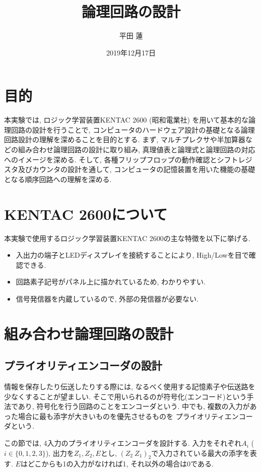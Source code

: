 \documentclass[titlepage]{jsarticle}
\title{論理回路の設計}
\author{平田 蓮}
\date{2019年12月17日}
\begin{document}
\maketitle
\section{目的}
  本実験では, ロジック学習装置KENTAC 2600 (昭和電業社) を用いて基本的な論理回路の設計を行うことで,
  コンピュータのハードウェア設計の基礎となる論理回路設計の理解を深めることを目的とする.
  まず, マルチプレクサや半加算器などの組み合わせ論理回路の設計に取り組み,
  真理値表と論理式と論理回路の対応へのイメージを深める.
  そして, 各種フリップフロップの動作確認とシフトレジスタ及びカウンタの設計を通して,
  コンピュータの記憶装置を用いた機能の基礎となる順序回路への理解を深める.
\section{KENTAC 2600について}
  本実験で使用するロジック学習装置KENTAC 2600の主な特徴を以下に挙げる.
  \begin{itemize}
    \item 入出力の端子とLEDディスプレイを接続することにより, High/Lowを目で確認できる.
    \item 回路素子記号がパネル上に描かれているため, わかりやすい.
    \item 信号発信器を内蔵しているので, 外部の発信器が必要ない.
  \end{itemize}
\section{組み合わせ論理回路の設計}
  \subsection{プライオリティエンコーダの設計}
    情報を保存したり伝送したりする際には, なるべく使用する記憶素子や伝送路を少なくすることが望ましい.
    そこで用いられるのが符号化(エンコード)という手法であり, 符号化を行う回路のことをエンコーダという.
    中でも, 複数の入力があった場合に最も添字が大きいものを優先させるものを
    プライオリティエンコーダという.

    この節では, 4入力のプライオリティエンコーダを設計する.
    入力をそれぞれ$A_i$ ($i \in \{0, 1, 2, 3\}$), 出力を$Z_1, Z_2, E$とし,
    $(Z_2 \ Z_1)_2$で入力されている最大の添字を表す.
    $E$はどこからも1の入力がなければ1, それ以外の場合は0である.
\end{document}
